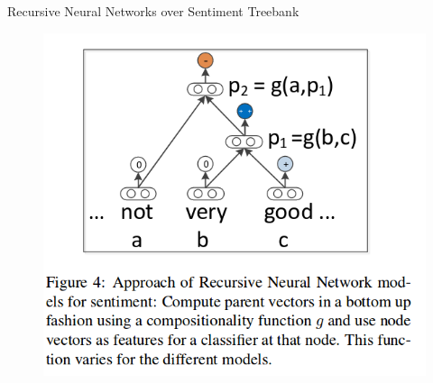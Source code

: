 \documentclass[handout]{beamer}
\begin{document}
\begin{frame}{Recursive Neural Networks over Sentiment Treebank}
   
    \begin{figure}[h]
        	\includegraphics[scale = 0.45]{pics/recTensor2.png}
        \end{figure}       
        
\end{frame}
\end{document}
